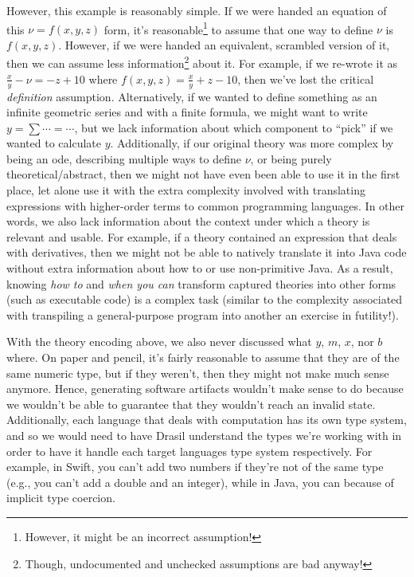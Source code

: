 However, this example is reasonably simple. If we were handed an equation of
this \(\nu{} = f(x,y,z)\) form, it's reasonable\footnote{However, it might be an
      incorrect assumption!} to assume that one way to define \(\nu{}\) is
\(f(x,y,z)\). However, if we were handed an equivalent, scrambled version of it,
then we can assume less information\footnote{Though, undocumented and unchecked
      assumptions are bad anyway!} about it. For example, if we re-wrote it as
\(\frac{x}{y} - \nu{} = - z + 10\) where \(f(x,y,z) = \frac{x}{y} + z - 10\),
then we've lost the critical \textit{definition} assumption. Alternatively, if
we wanted to define something as an infinite geometric series and with a finite
formula, we might want to write \(y = \sum \cdots{} = \cdots{}\), but we lack
information about which component to ``pick'' if we wanted to calculate \(y\).
Additionally, if our original theory was more complex by being an \acs{ode},
describing multiple ways to define \(\nu{}\), or being purely
theoretical/abstract, then we might not have even been able to use it in the
first place, let alone use it with the extra complexity involved with
translating expressions with higher-order terms to common programming languages.
In other words, we also lack information about the context under which a theory
is relevant and usable. For example, if a theory contained an expression that
deals with derivatives, then we might not be able to natively translate it into
Java code without extra information about how to or use non-primitive Java. As a
result, knowing \textit{how to} and \textit{when you can} transform captured
theories into other forms (such as executable code) is a complex task (similar
to the complexity associated with transpiling a general-purpose program into
another \textemdash{} an exercise in futility!).

With the theory encoding above, we also never discussed what \(y\), \(m\),
\(x\), nor \(b\) where. On paper and pencil, it's fairly reasonable to assume
that they are of the same numeric type, but if they weren't, then they might not
make much sense anymore. Hence, generating software artifacts wouldn't make
sense to do because we wouldn't be able to guarantee that they wouldn't reach an
invalid state. Additionally, each language that deals with computation has its
own type system, and so we would need to have Drasil understand the types we're
working with in order to have it handle each target languages type system
respectively. For example, in Swift, you can't add two numbers if they're not of
the same type (e.g., you can't add a double and an integer), while in Java, you
can because of implicit type coercion.

